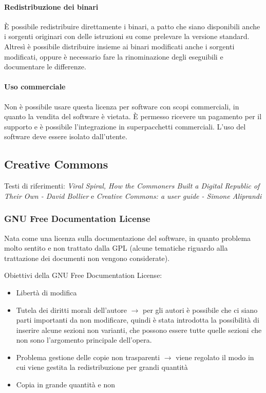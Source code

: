\paragraph*{Redistribuzione dei binari}\`E possibile redistribuire direttamente i binari, a patto che siano disponibili anche i sorgenti originari con delle istruzioni su come prelevare la versione standard. Altres\`i \`e possibile distribuire insieme ai binari modificati anche i sorgenti modificati, oppure \`e necessario fare la rinominazione degli eseguibili e documentare le differenze.

\paragraph*{Uso commerciale}Non \`e possibile usare questa licenza per software con scopi commerciali, in quanto la vendita del software \`e vietata. \`E permesso ricevere un pagamento per il supporto e \`e possibile l'integrazione in superpacchetti commerciali. L'uso del software deve essere isolato dall'utente.

\subsection{Creative Commons}

Testi di riferimenti: \textit{Viral Spiral, How the Commoners Built a Digital Republic of Their Own - David Bollier} e \textit{Creative Commons: a user guide - Simone Aliprandi}

\subsubsection{GNU Free Documentation License}

Nata come una licenza sulla documentazione del software, in quanto problema molto sentito e non trattato dalla GPL (alcune tematiche riguardo alla trattazione dei documenti non vengono considerate).

Obiettivi della GNU Free Documentation License:
\begin{itemize}

\item Libert\`a di modifica
\item Tutela dei diritti morali dell'autore $\to$ per gli autori \`e possibile che ci siano parti importanti da non modificare, quindi \`e stata introdotta la possibilit\`a di inserire alcune sezioni non varianti, che possono essere tutte quelle sezioni che non sono l'argomento principale dell'opera.
\item Problema gestione delle copie non trasparenti $\to$ viene regolato il modo in cui viene gestita la redistribuzione per grandi quantit\`a 
\item Copia in grande quantit\`a e non

\end{itemize} 

